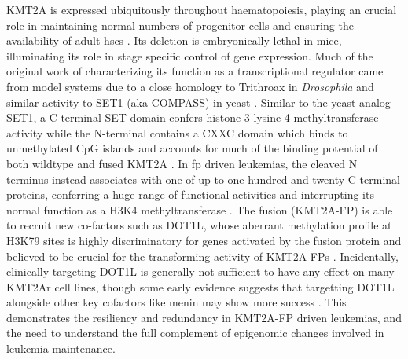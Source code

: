 %
KMT2A is expressed ubiquitously throughout haematopoiesis, playing an crucial role in maintaining normal numbers of progenitor cells and ensuring the availability of adult \glspl{hsc} \cite{Meyer2017, Antunes2020, Ernst2004} . Its deletion is embryonically lethal in mice, illuminating its role in stage specific control of gene expression. Much of the original work of characterizing its function as a transcriptional regulator came from model systems due to a close homology to Trithroax in \textit{Drosophila} and similar activity to SET1 (aka COMPASS) in yeast \cite{Popovic2005}. 
Similar to the yeast analog SET1, a C-terminal SET domain confers histone 3 lysine 4 methyltransferase activity while the N-terminal contains a CXXC domain which binds to unmethylated CpG islands and accounts for much of the binding potential of both wildtype and fused KMT2A \cite{JJ2003, Hsieh2003, Cierpicki2010,Ayton2004,LE2013}. 
In \gls{fp} driven leukemias, the cleaved N terminus instead associates with one of up to one hundred and twenty C-terminal proteins, conferring a huge range of functional activities and interrupting its normal function as a H3K4 methyltransferase \cite{Hsieh2003}. 
The fusion (KMT2A-FP) is able to recruit new co-factors such as DOT1L, whose aberrant methylation profile at H3K79 sites is highly discriminatory for genes activated by the fusion protein and believed to be crucial for the transforming activity of KMT2A-FPs \cite{YOkada2005, KMBernt2011}. Incidentally, clinically targeting DOT1L is generally not sufficient to have any effect on many KMT2Ar cell lines, though some early evidence suggests that targetting DOT1L alongside other key cofactors like menin may show more success \cite{Dafflon2016}. This demonstrates the resiliency and redundancy in KMT2A-FP driven leukemias, and the need to understand the full complement of epigenomic changes involved in leukemia maintenance.  



